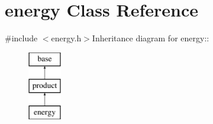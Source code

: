 \hypertarget{classenergy}{
\section{energy Class Reference}
\label{classenergy}
}


{\ttfamily \#include $<$energy.h$>$}Inheritance diagram for energy::\begin{figure}[H]
\begin{center}
\leavevmode
\includegraphics[height=3cm]{classenergy}
\end{center}
\end{figure}
